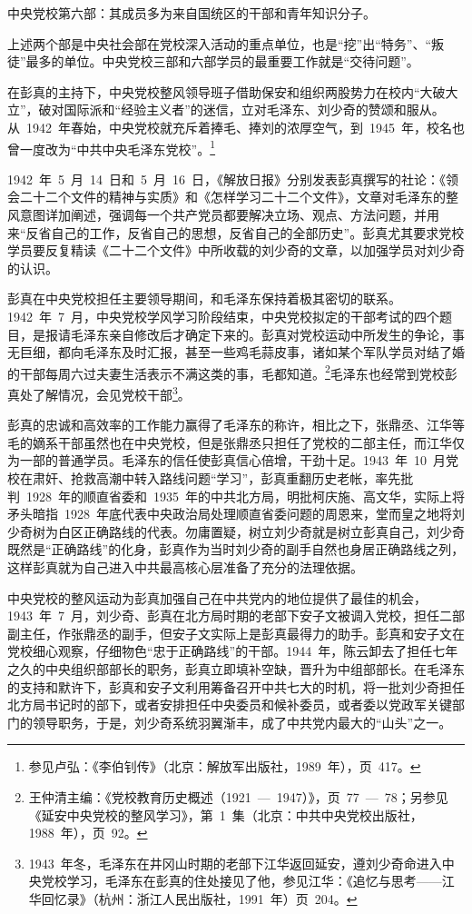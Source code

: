 中央党校第六部：其成员多为来自国统区的干部和青年知识分子。

上述两个部是中央社会部在党校深入活动的重点单位，也是“挖”出“特务”、“叛徒”最多的单位。中央党校三部和六部学员的最重要工作就是“交待问题”。

在彭真的主持下，中央党校整风领导班子借助保安和组织两股势力在校内“大破大立”，破对国际派和“经验主义者”的迷信，立对毛泽东、刘少奇的赞颂和服从。从~1942~年春始，中央党校就充斥着捧毛、捧刘的浓厚空气，到~1945~年，校名也曾一度改为“中共中央毛泽东党校”。\footnote{参见卢弘：《李伯钊传》（北京：解放军出版社，1989~年），页~417。}

1942~年~5~月~14~日和~5~月~16~日，《解放日报》分别发表彭真撰写的社论：《领会二十二个文件的精神与实质》和《怎样学习二十二个文件》，文章对毛泽东的整风意图详加阐述，强调每一个共产党员都要解决立场、观点、方法问题，并用来“反省自己的工作，反省自己的思想，反省自己的全部历史”。彭真尤其要求党校学员要反复精读《二十二个文件》中所收载的刘少奇的文章，以加强学员对刘少奇的认识。

彭真在中央党校担任主要领导期间，和毛泽东保持着极其密切的联系。1942~年~7~月，中央党校学风学习阶段结束，中央党校拟定的干部考试的四个题目，是报请毛泽东亲自修改后才确定下来的。彭真对党校运动中所发生的争论，事无巨细，都向毛泽东及时汇报，甚至一些鸡毛蒜皮事，诸如某个军队学员对结了婚的干部每周六过夫妻生活表示不满这类的事，毛都知道。\footnote{王仲清主编：《党校教育历史概述（1921~—~1947）》，页~77~—~78；另参见《延安中央党校的整风学习》，第~1~集（北京：中共中央党校出版社，1988~年），页~92。}毛泽东也经常到党校彭真处了解情况，会见党校干部\footnote{1943~年冬，毛泽东在井冈山时期的老部下江华返回延安，遵刘少奇命进入中央党校学习，毛泽东在彭真的住处接见了他，参见江华：《追忆与思考——江华回忆录》（杭州：浙江人民出版社，1991~年）页~204。}。

彭真的忠诚和高效率的工作能力赢得了毛泽东的称许，相比之下，张鼎丞、江华等毛的嫡系干部虽然也在中央党校，但是张鼎丞只担任了党校的二部主任，而江华仅为一部的普通学员。毛泽东的信任使彭真信心倍增，干劲十足。1943~年~10~月党校在肃奸、抢救高潮中转入路线问题“学习”，彭真重翻历史老帐，率先批判~1928~年的顺直省委和~1935~年的中共北方局，明批柯庆施、高文华，实际上将矛头暗指~1928~年底代表中央政治局处理顺直省委问题的周恩来，堂而皇之地将刘少奇树为白区正确路线的代表。勿庸置疑，树立刘少奇就是树立彭真自己，刘少奇既然是“正确路线”的化身，彭真作为当时刘少奇的副手自然也身居正确路线之列，这样彭真就为自己进入中共最高核心层准备了充分的法理依据。

中央党校的整风运动为彭真加强自己在中共党内的地位提供了最佳的机会，1943~年~7~月，刘少奇、彭真在北方局时期的老部下安子文被调入党校，担任二部副主任，作张鼎丞的副手，但安子文实际上是彭真最得力的助手。彭真和安子文在党校细心观察，仔细物色“忠于正确路线”的干部。1944~年，陈云卸去了担任七年之久的中央组织部部长的职务，彭真立即填补空缺，晋升为中组部部长。在毛泽东的支持和默许下，彭真和安子文利用筹备召开中共七大的时机，将一批刘少奇担任北方局书记时的部下，或者安排担任中央委员和候补委员，或者委以党政军关键部门的领导职务，于是，刘少奇系统羽翼渐丰，成了中共党内最大的“山头”之一。

